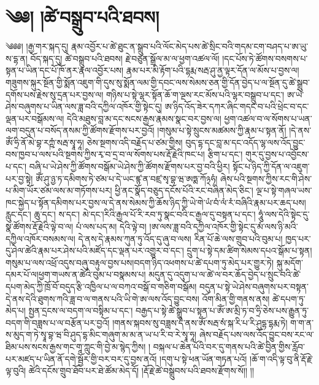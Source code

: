 \chapter{༄༅། །ཚེ་བསྒྲུབ་པའི་ཐབས།}༄༅༅། །རྒྱ་གར་སྐད་དུ། རྣམ་འབྱོར་པ་ཚེ་ཐུང་ན་སྒྲུབ་པའི་ལོང་མེད་པས་ཚེ་སྲིང་བའི་གདམ་ངག་བཤད་པ་ཨ་ཡུ་ས་དྷ་ན། བོད་སྐད་དུ། ཚེ་བསྒྲུབ་པའི་ཐབས། རྗེ་བཙུན་སྒྲོལ་མ་ལ་ཕྱག་འཚལ་ལོ། །དང་པོས་ཏེ་ཚོགས་བསགས་པ་སྟན་པ་ཡིན་དང་པོ་ཁོ་ནར་རྣལ་འབྱོར་པས། རྣམ་པར་མི་རྟོག་པའི་དྷརྨ་སརྦ་ཤུ་ནྱ་ལྟར་དོན་ལ་མོས་པ་བྱས་ལ།གཟུགས་སྐུར་སྔོན་གྱི་སྨོན་འཇུག་གི་དུས་སུ་སྨོན་ལམ་གྱི་དབང་ལས་སེམས་ཅན་གྱི་དོན་བྱེད་པ་ལ་སྔོན་དུ་ཚེ་སྒྲུབ་དགོས་པས་རྗེས་སུ་དྲན་པར་བྱས་ལ། གཉིས་པ་སྟེ་ལྷར་སྟོན་ཆོ་ག་ལྔས་རང་མོས་པའི་ལྷར་བསྒྲུབ་པ་དང་། ཨ་ཡེ་ཤེས་བཞུགས་པ་ཡིན་ལས་ཟླ་བའི་དཀྱིལ་འཁོར་གྱི་སྟེང་དུ། ཨ་ཉིད་འོད་ཟེར་དཀར་ཞིང་གདང་བ་པའི་ཕྲེང་བ་དང་ལྡན་པར་བསྒོམས་ལ། དེའི་མཐུས་བླ་མ་དང་སངས་རྒྱས་རྣམས་སྣང་བར་བྱས་ལ། ཕྱག་འཚལ་བ་ལ་སོགས་པ་ཡན་ལག་བདུན་པ་བསོད་ནསམ་ཀྱི་ཚོགས་རྫོགས་པར་བྱའོ། །གསུམ་པ་སྟེ་སྲུངས་མཚམས་ཀྱི་རྣམ་པ་སྟན་ནོ། །དེ་ནས་ཨོཾ་ཧྲི་ནོ་མེ་བྷ་རཀྵཾ་སརྦ་སྭཱ་ཧཱ། ཅེས་སྔགས་འདི་བརྗོད་པ་ཙམ་གྱིས། བུད་དྷ་དང་བླ་མ་དང་འདོད་ལྷ་ལས་འོད་བྱུང་བས་ཁྱབ་པ་ལས་པའི་སྔགས་ཀྱིས་རྭ་བ་དྲ་བ་ལ་སོགས་པས་རྡོ་རྗེའི་ཁང་པ། རྩིག་པ་དང་། གུར་དུ་བྱས་པ་འབྱོངས་པ་དང་། བཞི་པ་ཡེ་ཤེས་ཀྱི་ཚོགས་བསྒོམ་ཡེ་ཤེས་ཀྱི་ཚོགས་རྫོགས་པར་བྱ་བའི་ཕྱིར། སྟོང་པ་ཉིད་ཀྱི་དོན་ལ་འཇུག་པར་བྱ་སྟེ། ཨོཾ་ཤུ་ཉྱ་ཏ་དམིགས་ཏེ་ཙམ་པ་དེ་ཡང་ཛྙ་ན་བཛྲ་སྭ་བྷ་ཝ་ཨཏྨ་ཀོ྅ཧཾ། ཞེས་པའི་སྔགས་ཀྱིས་རང་གི་ཤེས་པ་མིག་ཡོར་ཙམ་ལས་མ་གཏོགས་པར། ཕྱི་ནང་སྣོད་བཅུད་དངོས་པོའི་རང་བཞིན་མེད་ཅིང་། ལྔ་པ་སྟེ་གཞལ་ཡས་ཁང་སྐྱེད་པ་སྟོན་དམིགས་པར་བྱས་ལ་དེ་ནས་སེམས་ཀྱི་ཆོས་ཉིད་ཀྱི་ཡེ་གེ་ཡཾ་བཾ་ལཾ་རཾ་བཞིའི་རྣམ་པར་ཆད་པས། རླུང་དང་། ཆུ་དང་། ས་དང་། མེ་དང་།རིའི་རྒྱལ་པོ་རི་རབ་ཏུ་སྣང་བའི་ང་རྒྱལ་དུ་བསྟན་པ་དང་། ཧཱུཾ་ལས་དེའི་སྟེང་དུ་སྣ་ཚོགས་རྡོ་རྗེའི་ལྟེ་བ་ལ། པཾ་ལས་པད་མ། དེའི་ལྟེ་བ། །ཨ་ལས་ཟླ་བའི་དཀྱིལ་འཁོར་གྱི་སྟེང་དུ་མཾ་ལས་ཉི་མའི་དཀྱིལ་འཁོར་བསམས་ལ། དེ་ནས་དེ་རྣམས་ཀུན་ཏུ་འོད་དུ་ཞུ་བ་ལས། རིན་པོ་ཆེ་ལས་གྲུབ་པའི་བུམ་པ། ཁྱད་པར་དུ་ཤེལ་ཚེའི་རྣམ་པར་ཤེས་པའི་མཛོད་དང་ལྡན་པར་འགྱུར་བ་དང་། དྲུག་པ་སྟེ་དམ་ཚིག་སེམས་དཔའ་སྒོམ་པ་སྟན། གསུམ་པ་ལས་འཕྲོ་འདུས་བཞུ་བརྟུལ་བྱས་པས།བདག་ཉིད་འཕགས་པ་ཚེ་དཔག་ཏུ་མེད་པར་གྱུར་ཏེ། སྐུ་མདོག་དམར་པོ་ལ།ཕྱག་གཡས་ན་ཚེའི་བུམ་པ་བསྣམས་པ། མདུན་དུ་འདུག་པ་ལ་ཚེ་ལ་བར་ཆོད་བྱེད་པ་སྲུང་བའི་ཚེ་དཔག་མེད་ཀྱི་ཁྲོ་བོ་བདུད་རྩི་འཁྱིལ་པ་ལ་བཀའ་བསྒོ་བ་གཅིག་བསྒོམ། བདུན་པ་སྟེ་ཡེ་ཤེས་བཞུགས་པར་བསྟན་དེ་ནས་དེའི་ཐུགས་ཀའི་ཟླ་བ་ལ་གནས་པའི་ཡི་གེ་ཨ་ལས་འོད་བྱུང་བས། འོག་མིན་གྱི་གནས་ནས། ཚེ་དཔག་ཏུ་མེད་པ། སྤྱན་དྲངས་ལ་བདག་ལ་བསྟིམ་པ་དང་། བརྒྱད་པ་སྟེ་ཚེ་སྒྲུབ་པ་སྟན་པ་ཨོཾ་ཨ་མྲི་ཏ་བ་ཧྲི་ཅེས་པས་རྒྱུན་ཏུ་བདག་གི་བཟླས་པ་ལ་བརྩོན་པར་བྱའོ། །གནས་སྐབས་སུ་བཟླས་དེ་ནས་ཨོཾ་སརྦ་སཾ་སྐ་རི་པ་རི་ཤུདྷ་དྷརྨ་ཏེ། ག་ག་ན་ས་མུད་ག་ཏེ་སྭཱ་བྷ་ཝ་བི་ཤུད་དྷ་མིང་གཞུག་མ་མ་ན་ཡ་པ་རི་བ་རེ་སྭཱ་ཧཱ། ཞེས་བརྗོད་པས་ལས་འོད་བྱུང་བས་རང་ལ་ཐིམ་པས་སངས་རྒྱས་གང་གཱ་ཀླུང་གི་བྱེ་མ་སྙེད་ཀྱིས། ། བསྐལ་པ་ཆེན་པོའི་བར་དུ་གནས་པའི་ཚེ་བྱིན་གྱིས་རློབ་པར་མཛད་པ་ཡིན་ནོ་དགེ་སྦྱོར་གྱི་བར་བར་དུ་བྱས་ནའོ། །དགུ་པ་སྟེ་ཕན་ཡོན་གཏན་པའོ། །ཆོ་ག་འདི་ལྟ་བུ་ནི་རྡོ་རྗེ་ལྟ་བུའི། ཚེའི་དངོས་གྲུབ་ཐོབ་པར་ཐེ་ཚོམ་མེད་དོ། །རྡོ་རྗེ་ཚེ་བསྒྲུབས་པའི་ཐབས་རྫོགས་སོ།། །།
